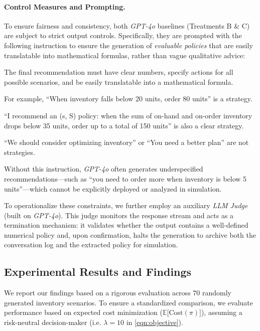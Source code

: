 \documentclass[mnsc,nonblindrev]{informs3_hide}
\begin{document}
\paragraph{Control Measures and Prompting.}
To ensure fairness and consistency, both \emph{GPT-4o} baselines (Treatments B \& C) are subject to strict output controls. Specifically, they are prompted with the following instruction to ensure the generation of \textit{evaluable policies} that are easily translatable into mathematical formulas, rather than vague qualitative advice:
\begin{tcolorbox}
    \scriptsize   
The final recommendation must have clear numbers, specify actions for all possible scenarios, and be easily translatable into a mathematical formula.

For example, ``When inventory falls below 20 units, order 80 units'' is a strategy.

``I recommend an (s, S) policy: when the sum of on-hand and on-order inventory drops below 35 units, order up to a total of 150 units'' is also a clear strategy.

``We should consider optimizing inventory'' or ``You need a better plan'' are not strategies.
\end{tcolorbox}
Without this instruction, \emph{GPT-4o} often generates underspecified recommendations—such as ``you need to order more when inventory is below 5 units''—which cannot be explicitly deployed or analyzed in simulation.

To operationalize these constraints, we further employ an auxiliary \textit{LLM Judge} (built on \mbox{\emph{GPT-4o}}). This judge monitors the response stream and acts as a termination mechanism: it validates whether the output contains a well-defined numerical policy and, upon confirmation, halts the generation to archive both the conversation log and the extracted policy for simulation.






    
\subsection{Experimental Results and Findings}


{We report our findings based on a rigorous evaluation across $70$ randomly generated inventory scenarios. To ensure a standardized comparison, we evaluate performance based on expected cost minimization ($\mathds{E}\big[\mathrm{Cost}(\pi)\big]$), assuming a risk-neutral decision-maker (i.e. $\lambda = 10$ in \cref{eqn:objective}).}
\end{document}
